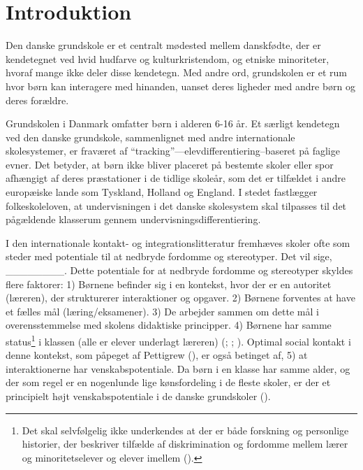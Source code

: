 \documentclass[
]{book}
\begin{document}
\section{Introduktion}\label{introduktion}

Den danske grundskole er et centralt mødested mellem danskfødte, der er kendetegnet ved hvid hudfarve og kulturkristendom, og etniske minoriteter, hvoraf mange ikke deler disse kendetegn. Med andre ord, grundskolen er et rum hvor børn kan interagere med hinanden, uanset deres ligheder med andre børn og deres forældre.

Grundskolen i Danmark omfatter børn i alderen 6-16 år. Et særligt kendetegn ved den danske grundskole, sammenlignet med andre internationale skolesystemer, er fraværet af ``tracking''---elevdifferentiering--baseret på faglige evner. Det betyder, at børn ikke bliver placeret på bestemte skoler eller spor afhængigt af deres præstationer i de tidlige skoleår, som det er tilfældet i andre europæiske lande som Tyskland, Holland og England. I stedet fastlægger folkeskoleloven, at undervisningen i det danske skolesystem skal tilpasses til det pågældende klasserum gennem undervisningsdifferentiering.

I den internationale kontakt- og integrationslitteratur fremhæves skoler ofte som steder med potentiale til at nedbryde fordomme og stereotyper. Det vil sige, \_\_\_\_\_\_\_\_. Dette potentiale for at nedbryde fordomme og stereotyper skyldes flere faktorer: 1) Børnene befinder sig i en kontekst, hvor der er en autoritet (læreren), der strukturerer interaktioner og opgaver. 2) Børnene forventes at have et fælles mål (læring/eksamener). 3) De arbejder sammen om dette mål i overensstemmelse med skolens didaktiske principper. 4) Børnene har samme status\footnote{Det skal selvfølgelig ikke underkendes at der er både forskning og personlige historier, der beskriver tilfælde af diskrimination og fordomme mellem lærer og minoritetselever og elever imellem ().} i klassen (alle er elever underlagt læreren) (; ; ). Optimal social kontakt i denne kontekst, som påpeget af Pettigrew (), er også betinget af, 5) at interaktionerne har venskabspotentiale. Da børn i en klasse har samme alder, og der som regel er en nogenlunde lige kønsfordeling i de fleste skoler, er der et principielt højt venskabspotentiale i de danske grundskoler ().
\end{document}
